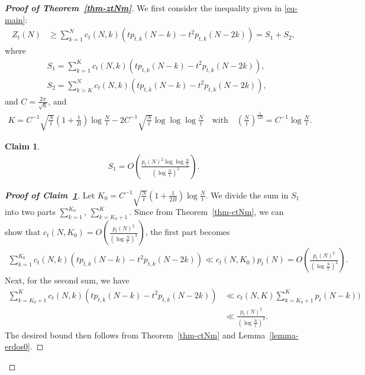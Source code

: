 \documentclass[11pt]{amsart}
\theoremstyle{plain}
\newtheorem{claim}[]{Claim}
\numberwithin{equation}{section}
\begin{document}
	\begin{proof}[\textbf{\boldmath Proof of Theorem~\ref{thm-ztNm}}]
		We first consider the inequality given in \eqref{eq-main}:
		\begin{align}\label{eq-main1}
			Z_t(N)&\ge \sum_{k=1}^{N}c_t(N,k)\left(tp_{t,k}(N-k)-t^{2}p_{t,k}(N-2k)\right)=S_1+S_2,
		\end{align}
		where 
		\begin{align*}
			&S_1 =\sum_{k=1}^{K}c_t(N,k)\left(tp_{t,k}(N-k)-t^{2}p_{t,k}(N-2k)\right),\\
			&S_2=\sum_{k>K}^{N}c_t(N,k)\left(tp_{t,k}(N-k)-t^{2}p_{t,k}(N-2k)\right),
		\end{align*}
		and $C=\frac{2\pi }{\sqrt{6}}$, and
		\begin{align*}
			K= C^{-1}\sqrt{\frac{N}{t}}\left(1+\frac{1}{B}\right)\log \frac{N}{t}-2C^{-1}\sqrt{\frac{N}{t}}\log \log \log \frac{N}{t} \quad\text{with} \quad \left(\frac{N}{t}\right)^{\frac{1}{2B}}=C^{-1}\log \frac{N}{t}.
		\end{align*}
		\begin{claim}\label{claim-S1}
			\begin{align*}
				S_1=O\left(\frac{p_t(N)^{2}\log \log \frac{N}{t}}{\left(\log \frac{N}{t}\right)^{2}}\right).  
			\end{align*}    
		\end{claim}
		\begin{proof}[\textbf{\boldmath Proof of Claim~\ref{claim-S1}}]
			Let $K_0= C^{-1}\sqrt{\frac{N}{t}}\left(1+\frac{1}{2B}\right)\log \frac{N}{t}$. We divide the sum in $S_1$ into two parts $\sum_{k=1}^{K_0}$, $\sum_{k=K_0+1}^{K}$. Since from Theorem~\ref{thm-ctNm}, we can show that $c_t(N,K_0)=O\left(\frac{p_t(N)^{2}}{ \left(\log \frac{N}{t}\right)^{2}}\right)$, the first part becomes
			\begin{align*}
				\sum_{k=1}^{K_0} c_t(N,k)\left(tp_{t,k}(N-k)-t^{2}p_{t,k}(N-2k)\right)\ll c_t(N,K_0)p_t(N)=O\left(\frac{p_t(N)^{2}}{ \left(\log \frac{N}{t}\right)^{2}}\right). 
			\end{align*}
			Next, for the second sum, we have
			\begin{align*}
				\sum_{k=K_0+1}^{K} c_t(N,k)\left(tp_{t,k}(N-k)-t^{2}p_{t,k}(N-2k)\right)&\ll c_t(N,K)\sum_{k=K_0+1}^{K} p_t(N-k))\\
				&\ll \frac{p_t(N)^{2}}{ \left(\log \frac{N}{t}\right)^{2}}.
			\end{align*}
			The desired bound then follows from Theorem~\ref{thm-ctNm} and Lemma~\ref{lemma-erdos0}.
		\end{proof}

\end{proof}
\end{document}
